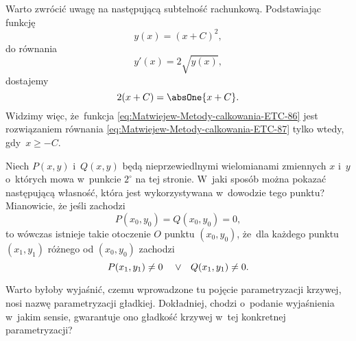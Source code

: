 \documentclass[a4paper,11pt]{article}
\numberwithin{equation}{section}
\begin{document}
\VerSpaceFour





\noindent
{} Warto zwrócić uwagę na następującą subtelność rachunkową.
Podstawiając funkcję
\begin{equation}
  \label{eq:Uwagi-do-konkrentych-stron-66}
  y( x ) = ( x + C )^{ 2 },
\end{equation}
do równania
\begin{equation}
  \label{eq:Uwagi-do-konkrentych-stron-67}
  y'( x ) = 2 \sqrt{ y( x ) },
\end{equation}
dostajemy
\begin{equation}
  \label{eq:Uwagi-do-konkrentych-stron-68}
  2 ( x + C ) = \absOne{ x + C }.
\end{equation}
Widzimy więc, że~funkcja \eqref{eq:Matwiejew-Metody-calkowania-ETC-86}
jest rozwiązaniem równania \eqref{eq:Matwiejew-Metody-calkowania-ETC-87}
tylko wtedy, gdy~$x \geq -C$.

\VerSpaceFour





\noindent
{} Niech $P( x, y )$ i~$Q( x, y )$ będą nieprzewiedlnymi wielomianami
zmiennych $x$ i~$y$ o~których mowa w~punkcie $2^{ \circ }$ na tej stronie.
W~jaki sposób można pokazać następującą własność, która jest wykorzystywana
w~dowodzie tego punktu? Mianowicie, że jeśli zachodzi
\begin{equation}
  \label{eq:Uwagi-do-konkrentych-stron-69}
  P( x_{ 0 }, y_{ 0 } ) = Q( x_{ 0 }, y_{ 0 } ) = 0,
\end{equation}
to wówczas istnieje takie otoczenie $O$ punktu $( x_{ 0 }, y_{ 0 } )$,
że~dla każdego punktu $( x_{ 1 }, y_{ 1 } )$ różnego od $( x_{ 0 }, y_{ 0 } )$
zachodzi
\begin{equation}
  \label{eq:Uwagi-do-konkrentych-stron-70}
  P( x_{ 1 }, y_{ 1 } ) \neq 0 \HorSpaceFiveteen \HorSpaceFiveteen
  \HorSpaceOne
  \vee \HorSpaceSixteen
  Q( x_{ 1 }, y_{ 1 } ) \neq 0.
\end{equation}

\VerSpaceFour





\noindent
{} Warto byłoby wyjaśnić, czemu wprowadzone tu pojęcie parametryzacji
krzywej, nosi nazwę parametryzacji gładkiej. Dokładniej, chodzi
o~podanie wyjaśnienia w~jakim sensie, gwarantuje ono gładkość krzywej w~tej
konkretnej parametryzacji?

\VerSpaceFour
\end{document}
